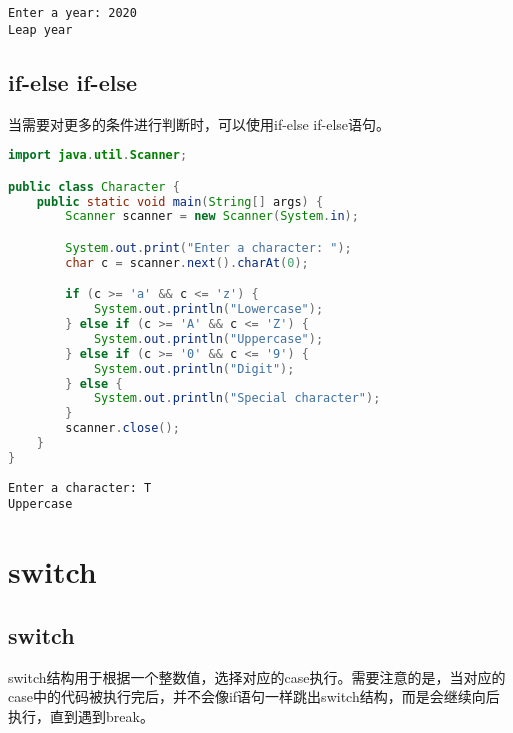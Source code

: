 \begin{tcolorbox}
	\begin{verbatim}
Enter a year: 2020
Leap year
\end{verbatim}
\end{tcolorbox}

\vspace{0.5cm}

\subsection{if-else if-else}

当需要对更多的条件进行判断时，可以使用if-else if-else语句。\\


\begin{lstlisting}[language=Java]
import java.util.Scanner;

public class Character {
	public static void main(String[] args) {
		Scanner scanner = new Scanner(System.in);

		System.out.print("Enter a character: ");
		char c = scanner.next().charAt(0);

		if (c >= 'a' && c <= 'z') {
			System.out.println("Lowercase");
		} else if (c >= 'A' && c <= 'Z') {
			System.out.println("Uppercase");
		} else if (c >= '0' && c <= '9') {
			System.out.println("Digit");
		} else {
			System.out.println("Special character");
		}
		scanner.close();
	}
}	
\end{lstlisting}

\begin{tcolorbox}
	\begin{verbatim}
Enter a character: T
Uppercase
\end{verbatim}
\end{tcolorbox}

\newpage

\section{switch}

\subsection{switch}

switch结构用于根据一个整数值，选择对应的case执行。需要注意的是，当对应的case中的代码被执行完后，并不会像if语句一样跳出switch结构，而是会继续向后执行，直到遇到break。\\

